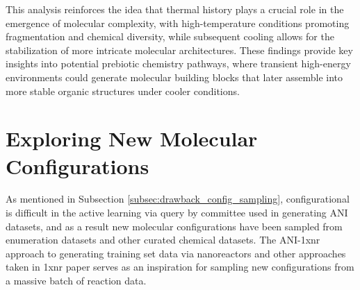 This analysis reinforces the idea that thermal history plays a crucial role in the emergence of molecular complexity, with high-temperature conditions promoting fragmentation and chemical diversity, while subsequent cooling allows for the stabilization of more intricate molecular architectures. These findings provide key insights into potential prebiotic chemistry pathways, where transient high-energy environments could generate molecular building blocks that later assemble into more stable organic structures under cooler conditions.

\section{Exploring New Molecular Configurations}
\label{sec:exploring_new_mol_configs}

As mentioned in Subsection \ref{subsec:drawback_config_sampling}, configurational is difficult in the active learning via query by committee used in generating ANI datasets, and as a result new molecular configurations have been sampled from enumeration datasets and other curated chemical datasets.
The ANI-1xnr \cite{ani-1xnr} approach to generating training set data via nanoreactors and other approaches taken in 1xnr paper serves as an inspiration for sampling new configurations from a massive batch of reaction data.

